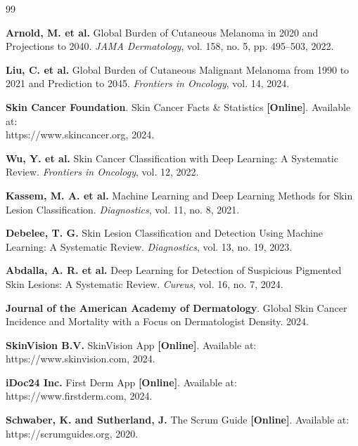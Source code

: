\renewcommand\bibname{BIBLIOGRAPHY}

\begin{thebibliography}{99}
\thispagestyle{MyStyle}

\textbf{Arnold, M. et al.} Global Burden of Cutaneous Melanoma in 2020 and Projections to 2040.
\textit{JAMA Dermatology}, vol. 158, no. 5, pp. 495--503, 2022.

\textbf{Liu, C. et al.} Global Burden of Cutaneous Malignant Melanoma from 1990 to 2021 and Prediction to 2045.
\textit{Frontiers in Oncology}, vol. 14, 2024.

\textbf{Skin Cancer Foundation}. Skin Cancer Facts \& Statistics \textbf{[Online]}.
Available at:\\
https://www.skincancer.org, 2024.

\textbf{Wu, Y. et al.} Skin Cancer Classification with Deep Learning: A Systematic Review.
\textit{Frontiers in Oncology}, vol. 12, 2022.

\textbf{Kassem, M. A. et al.} Machine Learning and Deep Learning Methods for Skin Lesion Classification.
\textit{Diagnostics}, vol. 11, no. 8, 2021.

\textbf{Debelee, T. G.} Skin Lesion Classification and Detection Using Machine Learning: A Systematic Review.
\textit{Diagnostics}, vol. 13, no. 19, 2023.

\textbf{Abdalla, A. R. et al.} Deep Learning for Detection of Suspicious Pigmented Skin Lesions: A Systematic Review.
\textit{Cureus}, vol. 16, no. 7, 2024.

\textbf{Journal of the American Academy of Dermatology}. Global Skin Cancer Incidence and Mortality with a Focus on Dermatologist Density.
2024.

\textbf{SkinVision B.V.} SkinVision App \textbf{[Online]}.
Available at:\\
https://www.skinvision.com, 2024.

\textbf{iDoc24 Inc.} First Derm App \textbf{[Online]}.
Available at:\\
https://www.firstderm.com, 2024.

\textbf{Schwaber, K. and Sutherland, J.} The Scrum Guide \textbf{[Online]}.
Available at:\\
https://scrumguides.org, 2020.


\end{thebibliography}
